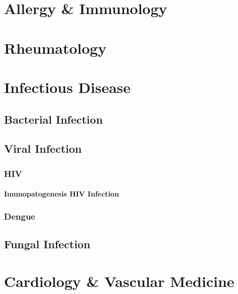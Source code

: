 \documentclass[
  letterpaper,
  DIV=11,
  numbers=noendperiod]{scrreprt}
\begin{document}
\chapter{Allergy \& Immunology}\label{allergy-immunology}

\chapter{Rheumatology}\label{rheumatology}

\chapter{Infectious Disease}\label{infectious-disease}

\section{Bacterial Infection}\label{bacterial-infection}

\section{Viral Infection}\label{viral-infection}

\subsection{HIV}\label{hiv}

\subsubsection{Imunopatogenesis HIV
Infection}\label{imunopatogenesis-hiv-infection}

\subsubsection{}\label{section}

\subsection{Dengue}\label{dengue}

\section{Fungal Infection}\label{fungal-infection}

\chapter{Cardiology \& Vascular
Medicine}\label{cardiology-vascular-medicine}
\end{document}

